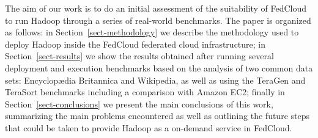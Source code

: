 %




The aim of our work is to do an initial assessment of the suitability of FedCloud to run Hadoop through a series of real-world benchmarks. The paper is organized as follows: in Section~\ref{sect-methodology} we describe the methodology used to deploy Hadoop inside the FedCloud federated cloud infrastructure; in Section~\ref{sect-results} we show the results obtained after running several deployment and execution benchmarks based on the analysis of two common data sets: Encyclop{\ae}dia Britannica and Wikipedia, as well as using the TeraGen and TeraSort benchmarks including a comparison with Amazon EC2; finally in Section~\ref{sect-conclusions} we present the main conclusions of this work, summarizing the main problems encountered as well as outlining the future steps that could be taken to provide Hadoop as a on-demand service in FedCloud.



